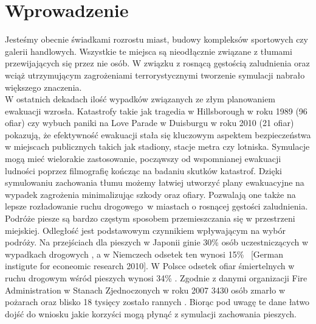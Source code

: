 \chapter{Wprowadzenie}
\label{cha:wprowadzenie}

Jesteśmy obecnie świadkami rozrostu miast, budowy kompleksów sportowych czy galerii handlowych. Wszystkie te miejsca są nieodłącznie związane z tłumami przewijających się przez nie osób. W związku z rosnącą gęstością zaludnienia oraz wciąż utrzymującym zagrożeniami terrorystycznymi \cite{terrorism} tworzenie symulacji nabrało większego znaczenia.\\

W ostatnich dekadach ilość wypadków związanych ze złym planowaniem ewakuacji wzrosła. Katastrofy takie jak tragedia w Hillsborough w roku 1989 (96 ofiar)\cite{hillsborough} czy wybuch paniki na Love Parade w Duisburgu w roku 2010 (21 ofiar)\cite{lovedisaster} pokazują, że efektywność ewakuacji stała się kluczowym aspektem bezpieczeństwa w miejscach publicznych takich jak stadiony, stacje metra czy lotniska. Symulacje mogą mieć wielorakie zastosowanie, począwszy od wspomnianej ewakuacji ludności poprzez filmografię kończąc na badaniu skutków katastrof. Dzięki symulowaniu zachowania tłumu możemy łatwiej utworzyć plany ewakuacyjne na wypadek zagrożenia minimalizując szkody oraz ofiary. Pozwalają one także na lepsze rozładowanie ruchu drogowego~w miastach o rosnącej gęstości zaludnienia. \\

Podróże piesze są bardzo częstym sposobem przemieszczania się w przestrzeni miejskiej. Odległość jest podstawowym czynnikiem wpływającym na wybór podróży. Na przejściach dla pieszych w Japonii ginie 30\% osób uczestniczących w wypadkach drogowych \cite{AMSFMfPBSaSC}, a w Niemczech odsetek ten wynosi 15\% \ [German instigute for econeomic research 2010]. W Polsce odsetek ofiar śmiertelnych w ruchu drogowym wśród pieszych wynosi 34\% \cite{metodologiaZachowan}. Zgodnie z danymi organizacji Fire Administration w Stanach Zjednoczonych w roku 2007 3430 osób zmarło w pożarach oraz blisko 18 tysięcy zostało rannych \cite{Asfemwle}. Biorąc pod uwagę te dane łatwo dojść do wniosku jakie korzyści mogą płynąć z symulacji zachowania pieszych.

